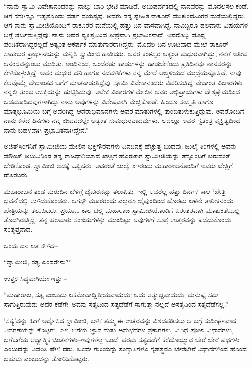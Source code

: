 “ನಾನು ಸ್ವಾಮಿ ವಿವೇಕಾನಂದರನ್ನು ನಾಲ್ಕು ಬಾರಿ ಭೇಟಿ ಮಾಡಿದೆ. ಅಬುಪರ್ವತದಲ್ಲಿ ನಾನವರನ್ನು ಮೊದಲಸಲ ಕಂಡೆ. ಆಗ ನನಗಿನ್ನೂ ಇಪ್ಪತ್ತೊಂದು ವರ್ಷ ವಯಸ್ಸಷ್ಟೆ. ಅವರು ನನ್ನ ಸ್ನೇಹಿತ ಠಾಕೂರ್ ಮುಕುಂದಸಿಂಗರ ಮನೆಯಲ್ಲಿದ್ದರು. ಆಗ ನಾನು ಸ್ವಾಮೀಜಿಯೊಂದಿಗೆ ಠಾಕೂರರ ಮನೆಯಲ್ಲಿ ಹತ್ತು ದಿನ ವಾಸವಾಗಿದ್ದೆ. ನಾವಿಬ್ಬರೂ ಹಲವಾರು ವಿಷಯಗಳ ಬಗ್ಗೆ ಚರ್ಚಿಸುತ್ತಿದ್ದೆವು. ನಾನು ಅವರ ವ್ಯಕ್ತಿತ್ವದಿಂದ ತೀವ್ರವಾಗಿ ಪ್ರಭಾವಿತನಾದೆ. ಅವರೊಬ್ಬ ದೊಡ್ಡ ಪಂಡಿತರಾಗಿದ್ದರಲ್ಲದೆ ಅತ್ಯಂತ ಆಕರ್ಷಕ ಮಾತುಗಾರರಾಗಿದ್ದರು. ಮೊದಲ ದಿನ ಊಟವಾದ ಮೇಲೆ ಠಾಕೂರ್ ಸಾಹೇಬರ ಪ್ರಾರ್ಥನೆಯನ್ನು ಮನ್ನಿಸಿ ಸ್ವಾಮೀಜಿ ಹಾಡಿದರು. ಅವರ ಕಂಠಸ್ವರ ಅತ್ಯಂತ ಮಧುರವಾಗಿದ್ದು, ನನಗೆ ಅತೀವ ಆನಂದವನ್ನುಂಟು ಮಾಡಿತು. ಅಂದಿನಿಂದ, ಒಂದೆರಡು ಹಾಡುಗಳನ್ನು ಹಾಡಬೇಕೆಂದು ಪ್ರತಿದಿನವೂ ನಾನವರನ್ನು ಕೇಳಿಕೊಳ್ಳುತ್ತಿದ್ದೆ. ಅವರ ಮಧುರ ದನಿ ಹಾಗೂ ನಡವಳಿಕೆಗಳು ನನ್ನ ಮೇಲೆ ಅಚ್ಚಳಿಯದ ಮುದ್ರೆಯನ್ನೊತ್ತಿವೆ. ನಾವು ಕೆಲವೊಮ್ಮೆ ವೇದಾಂತದ ಬಗೆಗೆ ಮಾತನಾಡುತ್ತಿದ್ದೆವು. ಸ್ವಾಮಿ ವಿವೇಕಾನಂದರು ವಿವರಿಸುತ್ತಿದ್ದ ವೇದಾಂತ ವಿಚಾರಗಳು ನನ್ನಲ್ಲಿ ತುಂಬ ಆಸಕ್ತಿಯನ್ನು ಹುಟ್ಟಿಸಿದುವು. ಅನೇಕ ವಿಚಾರಗಳ ಮೇಲಿನ ಅವರ ಅಭಿಪ್ರಾಯಗಳು ದೇಶಪ್ರೇಮದಿಂದ ಒಡಮೂಡಿದವುಗಳಾಗಿದ್ದು ನಾನು ಅವುಗಳನ್ನು ವಿಶೇಷವಾಗಿ ಮೆಚ್ಚಿಕೊಂಡೆ. ಹಿಂದೂ ಸಂಸ್ಕೃತಿ ಹಾಗೂ ಮಾತೃಭೂಮಿಯ ಬಗ್ಗೆ ಅವರಿಗಿದ್ದ ಆದರಾಭಿಮಾನಗಳು ಅವರ ಮಾತುಗಳಲ್ಲಿ ತುಂಬಿತುಳುಕುತ್ತಿದ್ದುವು. ಅವರೊಂದಿಗೆ ನಾನು ಕಳೆದ ದಿನಗಳು ನನ್ನ ಜೀವನದಲ್ಲೇ ಅತ್ಯಂತ ಸುಮಧುರವಾದವುಗಳು. ಅದಲ್ಲೂ ಅವರ ಸ್ವತಂತ್ರ ವ್ಯಕ್ತಿತ್ವದಿಂದ ನಾನು ಬಹಳವಾಗಿ ಪ್ರಭಾವಿತನಾಗಿದ್ದೇನೆ.”

ಅಜಿತ್​ಸಿಂಗನಿಗೆ ಸ್ವಾಮೀಜಿಯ ಮೇಲಿನ ಭಕ್ತಿಗೌರವಗಳು ದಿನದಿನಕ್ಕೆ ಹೆಚ್ಚುತ್ತ ಬಂದವು. ಜುಲೈ ತಿಂಗಳಲ್ಲಿ ಅವನು ಮೌಂಟ್ ಅಬುವಿನಿಂದ ತನ್ನ ರಾಜಧಾನಿಯಾದ ಖೇತ್ರಿಗೆ ಹೊರಟಾಗ ಸ್ವಾಮೀಜಿಯನ್ನು ತನ್ನೊಂದಿಗೆ ಬರುವಂತೆ ಬೇಡಿಕೊಂಡ. ಸ್ವಾಮೀಜಿ ಅದಕ್ಕೆ ಒಪ್ಪಿದರು. ಅದರಂತೆ ಜುಲೈ ೨೪ರಂದು ಮಹಾರಾಜನೊಂದಿಗೆ ಅವರು ಖೇತ್ರಿಗೆ ಹೊರಟರು.

ಮಹಾರಾಜನ ತಂಡ ಮರುದಿನ ಬೆಳಿಗ್ಗೆ ಜೈಪುರವನ್ನು ತಲುಪಿತು. ಇಲ್ಲಿ ಅವರೆಲ್ಲ ಹತ್ತು ದಿನಗಳ ಕಾಲ ‘ಖೇತ್ರಿ ಭವನ’ದಲ್ಲಿ ಉಳಿದುಕೊಂಡರು. ಆಗಸ್ಟ್ ಮೂರರಂದು ಎಲ್ಲರೂ ಜೈಪುರದಿಂದ ಹೊರಟು ಏಳನೇ ತಾರೀಕಿನಂದು ಖೇತ್ರಿಯನ್ನು ತಲುಪಿದರು. ಪ್ರಯಾಣ ಕಾಲ ದಲ್ಲಿ ಮಹಾರಾಜ ಸ್ವಾಮೀಜಿಯೊಂದಿಗೆ ನಿರಂತರವಾಗಿ ಮಾತುಕತೆಯಲ್ಲಿ ತೊಡಗಿರುತ್ತಿದ್ದ. ತನ್ನ ಹಲವಾರು ಸಂಶಯಗಳನ್ನು ಮುಂದಿಟ್ಟು ಅವುಗಳಿಗೆ ಸೂಕ್ತ ಉತ್ತರವನ್ನು ಪಡೆದುಕೊಂಡು ಸಂತೃಪ್ತನಾದ.

ಒಂದು ದಿನ ಆತ ಕೇಳಿದ–

“ಸ್ವಾಮೀಜಿ, ಸತ್ಯ ಎಂದರೇನು?”

ಉತ್ತರ ಸಿದ್ಧವಾಗಿಯೇ ಇತ್ತು –

“ಮಹಾರಾಜ, ಸತ್ಯ ಎಂಬುದು ಏಕಮೇವಾದ್ವಿತೀಯವಾದುದು; ಅದು ಅತ್ಯುಚ್ಚವಾದುದು. ಮನುಷ್ಯ ಸದಾ ಸಾಗುತ್ತಿರುವುದು ಅದರ ಕಡೆಗೇ–ಅವನು ಸತ್ಯದಿಂದ ಸತ್ಯದೆಡೆಗೆ ಸಾಗುತ್ತಾ ನಲ್ಲದೆ ಅಸತ್ಯದಿಂದ ಸತ್ಯದೆಡೆಗಲ್ಲ.”

‘ಸತ್ಯ’ವನ್ನು ಹೀಗೆ ಅರ್ಥೈಸಿದ ಸ್ವಾಮೀಜಿ, ಬಳಿಕ ತಮ್ಮ ಈ ಉತ್ತರವನ್ನು ವಿಶದಪಡಿಸಲು ಆ ಬಗ್ಗೆ ಸುದೀರ್ಘವಾದ ವಿವರಣೆಯನ್ನು ಕೊಟ್ಟರು. ಎಲ್ಲ ಬಗೆಯ ಜ್ಞಾನ ಮತ್ತು ಅನುಭವಗಳ ಪ್ರಕಾರಗಳು, ವಿವಿಧ ಪೂಜಾ ವಿಧಾನಗಳು, ಬಗೆಬಗೆಯ ಆಧ್ಯಾತ್ಮಿಕ ಚಿಂತನೆಗಳು–ಇವುಗಳೆಲ್ಲ ಒಂದೇ ಪರಮ ಸತ್ಯದೆಡೆಗೆ ಕರೆದೊಯ್ಯುವ ಬೇರೆ ಬೇರೆ ಪಥಗಳು ಎಂಬುದನ್ನು ವಿವರಿಸಿ ಹೇಳಿ ದರು. ಒಂದೇ ಗುರಿಯನ್ನು ಸಂನ್ಯಾಸಿಗಳೂ ಗೃಹಸ್ಥರೂ ಬೇರೆಬೇರೆ ವಿಧಾನಗಳಿಂದ ಹೊಂದ ಬಹುದು ಎಂಬುದನ್ನು ತೋರಿಸಿಕೊಟ್ಟರು.

